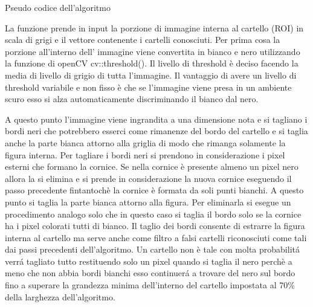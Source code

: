 		\begin{algorithm}[htp]
		\SetAlgoLined
		\caption{Pseudo codice dell'algoritmo}
		\end{algorithm}

		La funzione prende in input la porzione di immagine interna al cartello (ROI) in scala di grigi e il vettore contenente i cartelli conosciuti. Per prima cosa la porzione all'interno dell' immagine viene convertita in bianco e nero utilizzando la funzione di openCV cv::threshold(). Il livello di threshold è deciso facendo la media di livello di grigio di tutta l'immagine. Il vantaggio di avere un livello di threshold variabile e non fisso è che se l'immagine viene presa in un ambiente scuro esso si alza automaticamente discriminando il bianco dal nero.
		
		A questo punto l'immagine viene ingrandita a una dimensione nota e si tagliano i bordi neri che potrebbero esserci come rimanenze del bordo del cartello e si taglia anche la parte bianca attorno alla griglia di modo che rimanga solamente la figura interna. Per tagliare i bordi neri si prendono in considerazione i pixel esterni che formano la cornice. Se nella cornice è presente almeno un pixel nero allora la si elimina e si prende in considerazione la nuova cornice eseguendo il passo precedente fintantochè la cornice è formata da soli punti bianchi. A questo punto si taglia la parte bianca attorno alla figura. Per eliminarla si esegue un procedimento analogo solo che in questo caso si taglia il bordo solo se la cornice ha i pixel colorati tutti di bianco. Il taglio dei bordi consente di estrarre la figura interna al cartello ma serve anche come filtro a falsi cartelli riconosciuti come tali dai passi precedenti dell'algoritmo. Un cartello non è tale con molta probabilit\'a verr\'a tagliato  tutto restituendo solo un pixel quando si taglia il nero perchè a meno che non abbia bordi bianchi esso continuer\'a a trovare del nero sul bordo fino a superare la grandezza minima dell'interno del cartello impostata al 70\% della larghezza dell'algoritmo.
		
